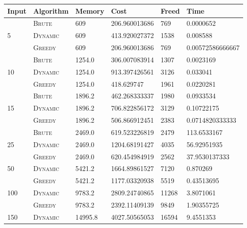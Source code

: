 \documentclass{article}
\begin{document}
\begin{adjustwidth}{-.5cm}{}
    \begin{center}
        \begin{tabular}{l|lllll} \toprule
 \textbf{Input} & \textbf{Algorithm} & \textbf{Memory} & \textbf{Cost} & \textbf{Freed} & \textbf{Time} \\ \hline
        & \textsc{Brute}   & 609       & 206.960013686    & 769      &  0.0000652            \\
5       & \textsc{Dynamic} & 609       & 413.920027372    & 1538     &  0.008588             \\
        & \textsc{Greedy}  & 609       & 206.960013686    & 769      &  0.00572586666667     \\ \midrule
        & \textsc{Brute}   & 1254.0    & 306.007083914    & 1307     &  0.0023169            \\
10      & \textsc{Dynamic} & 1254.0    & 913.397426561    & 3126     &  0.033041             \\
        & \textsc{Greedy}  & 1254.0    & 418.629747       & 1961     &  0.0220281            \\ \midrule
        & \textsc{Brute}   & 1896.2    & 462.268333337    & 1980     &  0.0933534            \\
15      & \textsc{Dynamic} & 1896.2    & 706.822856172    & 3129     &  0.10722175           \\
        & \textsc{Greedy}  & 1896.2    & 506.866912451    & 2383     &  0.0714820333333      \\ \midrule
        & \textsc{Brute}   & 2469.0    & 619.523226819    & 2479     &  113.6533167          \\
25      & \textsc{Dynamic} & 2469.0    & 1204.68191427    & 4035     &  56.92951935          \\
        & \textsc{Greedy}  & 2469.0    & 620.454984919    & 2562     &  37.9530137333        \\ \midrule
50      & \textsc{Dynamic} & 5421.2    & 1664.89861527    & 7120     &  0.870269             \\
        & \textsc{Greedy}  & 5421.2    & 1177.03320938    & 5519     &  0.43513695           \\ \midrule
100     & \textsc{Dynamic} & 9783.2    & 2809.24740865    & 11268    &  3.8071061            \\
        & \textsc{Greedy}  & 9783.2    & 2392.11409139    & 9849     &  1.90355725           \\ \midrule
150     & \textsc{Dynamic} & 14995.8   & 4027.50565053    & 16594    &  9.4551353            \\

\end{tabular}
\end{center}
\end{adjustwidth}
\end{document}
